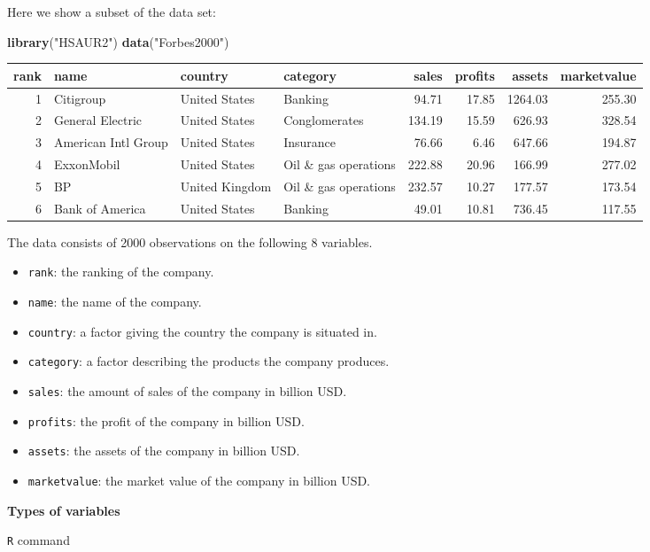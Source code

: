 \documentclass[]{article}
\def\tightlist{}
\newenvironment{Shaded}{\begin{snugshade}}{\end{snugshade}}
\newcommand{\KeywordTok}[1]{\textcolor[rgb]{0.13,0.29,0.53}{\textbf{{#1}}}}
\newcommand{\StringTok}[1]{\textcolor[rgb]{0.31,0.60,0.02}{{#1}}}
\newcommand{\NormalTok}[1]{{#1}}
\numberwithin{equation}{section}
\begin{document}
Here we show a subset of the data set:

\begin{Shaded}
\begin{Highlighting}[]
\KeywordTok{library}\NormalTok{(}\StringTok{"HSAUR2"}\NormalTok{)}
\KeywordTok{data}\NormalTok{(}\StringTok{"Forbes2000"}\NormalTok{)}
\end{Highlighting}
\end{Shaded}

\begin{longtable}[c]{@{}rlllrrrr@{}}
\toprule
rank & name & country & category & sales & profits & assets &
marketvalue\tabularnewline
\midrule
\endhead
1 & Citigroup & United States & Banking & 94.71 & 17.85 & 1264.03 &
255.30\tabularnewline
2 & General Electric & United States & Conglomerates & 134.19 & 15.59 &
626.93 & 328.54\tabularnewline
3 & American Intl Group & United States & Insurance & 76.66 & 6.46 &
647.66 & 194.87\tabularnewline
4 & ExxonMobil & United States & Oil \& gas operations & 222.88 & 20.96
& 166.99 & 277.02\tabularnewline
5 & BP & United Kingdom & Oil \& gas operations & 232.57 & 10.27 &
177.57 & 173.54\tabularnewline
6 & Bank of America & United States & Banking & 49.01 & 10.81 & 736.45 &
117.55\tabularnewline
\bottomrule
\end{longtable}

The data consists of 2000 observations on the following 8 variables.

\begin{itemize}
\tightlist
\item
  \texttt{rank}: the ranking of the company.
\item
  \texttt{name}: the name of the company.
\item
  \texttt{country}: a factor giving the country the company is situated
  in.
\item
  \texttt{category}: a factor describing the products the company
  produces.
\item
  \texttt{sales}: the amount of sales of the company in billion USD.
\item
  \texttt{profits}: the profit of the company in billion USD.
\item
  \texttt{assets}: the assets of the company in billion USD.
\item
  \texttt{marketvalue}: the market value of the company in billion USD.
\end{itemize}

\textbf{Types of variables}

\texttt{R} command
\end{document}
